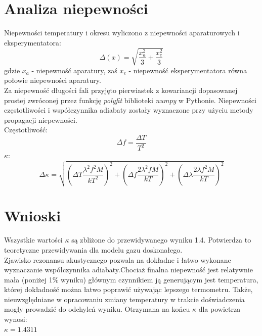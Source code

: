\documentclass[a4paper,10pt]{article}
\begin{document}
\section{Analiza niepewności}
Niepewności temperatury i okresu wyliczono z niepewności aparaturowych i eksperymentatora:\\
\begin{equation}
  \Delta(x) = \sqrt{\frac{x_a^2}{3}+\frac{x_e^2}{3}}
\end{equation}
gdzie $x_a$ - niepewność aparatury, zaś $x_e$ - niepewność eksperymentatora równa połowie niepewności aparatury.\\
Za niepewność długości fali przyjęto pierwiastek z kowariancji dopasowanej prostej zwróconej przez funkcję \emph{polyfit} biblioteki \emph{numpy} w Pythonie.
Niepewności częstotliwości i współczynnika adiabaty zostały wyznaczone przy użyciu metody propagacji niepewności.\\
Częstotliwość:
\begin{equation}
  \Delta f = \frac{\Delta T}{T^2}
\end{equation}
$\kappa$:
\begin{equation}
  \Delta \kappa = \sqrt{(\Delta T \frac{\lambda^2 f^2 M}{kT^2})^2+(\Delta f \frac{2\lambda^2 f M}{kT})^2+(\Delta \lambda \frac{2\lambda f^2 M}{kT})^2}
\end{equation}

\section{Wnioski}
Wszystkie wartości $\kappa$ są zbliżone do przewidywanego wyniku 1.4. Potwierdza to teoretyczne przewidywania dla modelu gazu doskonałego.
\\
Zjawisko rezonansu akustycznego pozwala na dokładne i łatwo wykonane wyznaczanie współczynnika adiabaty.Chociaż finalna niepewność jest relatywnie mała (poniżej 1\% wyniku) głównym czynnikiem ją generującym jest temperatura, której dokładność można łatwo poprawić używając lepszego termometru. Także, nieuwzględniane w opracowaniu zmiany temperatury w trakcie doświadczenia mogły prowadzić do odchyleń wyniku.
Otrzymana na końcu $\kappa$ dla powietrza wynosi:
\\ $\kappa = 1.4311$\\
\end{document}
